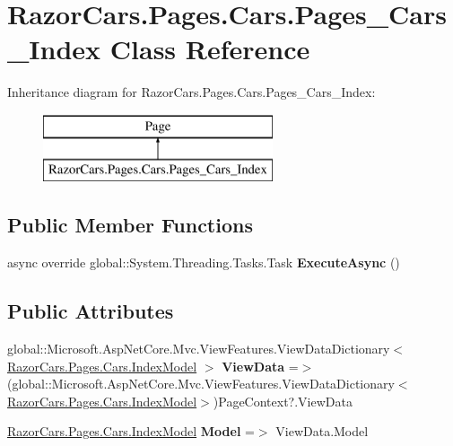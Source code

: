 \hypertarget{class_razor_cars_1_1_pages_1_1_cars_1_1_pages___cars___index}{}\section{Razor\+Cars.\+Pages.\+Cars.\+Pages\+\_\+\+Cars\+\_\+\+Index Class Reference}
\label{class_razor_cars_1_1_pages_1_1_cars_1_1_pages___cars___index}
Inheritance diagram for Razor\+Cars.\+Pages.\+Cars.\+Pages\+\_\+\+Cars\+\_\+\+Index\+:\begin{figure}[H]
\begin{center}
\leavevmode
\includegraphics[height=2.000000cm]{class_razor_cars_1_1_pages_1_1_cars_1_1_pages___cars___index}
\end{center}
\end{figure}
\subsection*{Public Member Functions}
\begin{DoxyCompactItemize}
\item 
\mbox{\label{class_razor_cars_1_1_pages_1_1_cars_1_1_pages___cars___index_ab6e3f64680dccaf587f8cd2d6f368404}} 
async override global\+::\+System.\+Threading.\+Tasks.\+Task {\bfseries Execute\+Async} ()
\end{DoxyCompactItemize}
\subsection*{Public Attributes}
\begin{DoxyCompactItemize}
\item 
\mbox{\label{class_razor_cars_1_1_pages_1_1_cars_1_1_pages___cars___index_a92fbb11d4bb6d24407873c78f46bc9ec}} 
global\+::\+Microsoft.\+Asp\+Net\+Core.\+Mvc.\+View\+Features.\+View\+Data\+Dictionary$<$ \mbox{\hyperlink{class_razor_cars_1_1_pages_1_1_cars_1_1_index_model}{Razor\+Cars.\+Pages.\+Cars.\+Index\+Model}} $>$ {\bfseries View\+Data} =$>$ (global\+::\+Microsoft.\+Asp\+Net\+Core.\+Mvc.\+View\+Features.\+View\+Data\+Dictionary$<$\mbox{\hyperlink{class_razor_cars_1_1_pages_1_1_cars_1_1_index_model}{Razor\+Cars.\+Pages.\+Cars.\+Index\+Model}}$>$)Page\+Context?.View\+Data
\item 
\mbox{\label{class_razor_cars_1_1_pages_1_1_cars_1_1_pages___cars___index_a8ae5324469b05f6c3846939d5d2f8307}} 
\mbox{\hyperlink{class_razor_cars_1_1_pages_1_1_cars_1_1_index_model}{Razor\+Cars.\+Pages.\+Cars.\+Index\+Model}} {\bfseries Model} =$>$ View\+Data.\+Model
\end{DoxyCompactItemize}
